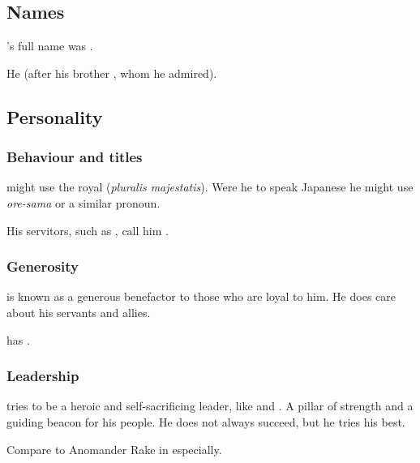 \subsection{Names}
\Secherdamon's full name was \Irocas \Veldraxx \Nexagglachel \Secherdamon. 

He  (after his brother , whom he admired). 








\subsection{Personality}





\subsubsection{Behaviour and titles}
\Secherdamon{} might use the royal  (\emph{pluralis majestatis}). 
Were he to speak Japanese he might use \emph{ore-sama} or a similar pronoun.

His servitors, such as \LocarPsyrex, call him . 





\subsubsection{Generosity}
\Secherdamon{} is known as a generous benefactor to those who are loyal to him. 
He does care about his servants and allies. 

\Ishnaruchaefir{} has . 





\subsubsection{Leadership}
\Secherdamon{} tries to be a heroic and self-sacrificing leader, like \TyarithXserasshana{} and \Nexagglachel. 
A pillar of strength and a guiding beacon for his people. 
He does not always succeed, but he tries his best. 

Compare to Anomander Rake in \cite{StevenErikson:TolltheHounds} especially. 


